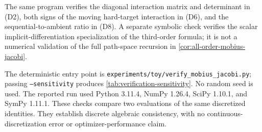 The same program verifies the diagonal interaction matrix and determinant in
\textup{(D2)}, both signs of the moving hard-target interaction in
\textup{(D6)}, and the sequential-to-ambient ratio in \textup{(D8)}.  A
separate symbolic check verifies the scalar
implicit-differentiation specialization of the third-order formula; it is not
a numerical validation of the full path-space recursion in
\cref{cor:all-order-mobius-jacobi}.

The deterministic entry point is
\nolinkurl{experiments/toy/verify_mobius_jacobi.py}; passing
\texttt{--sensitivity} produces \cref{tab:verification-sensitivity}.  No
random seed is used.  The reported run used Python 3.11.4, NumPy 1.26.4,
SciPy 1.10.1, and SymPy 1.11.1.  These checks compare two evaluations of the
same discretized identities.  They establish discrete algebraic consistency,
with no continuous-discretization error or optimizer-performance claim.

